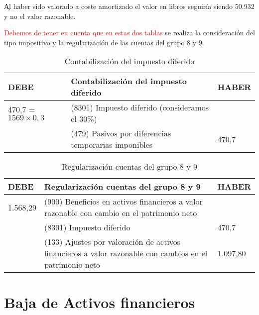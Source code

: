 \c{Al haber sido valorado a coste amortizado el valor en libros seguiría siendo 50.932 y no el valor razonable.}

\textcolor{red}{Debemos de tener en cuenta que en estas dos tablas} se realiza la consideración del tipo impositivo y la regularización de las cuentas del grupo 8 y 9.

\begin{table}[H]
    \centering
    \begin{tabular}{|p{3cm}|p{6cm}|p{3cm}|}
    \hline
    \rowcolor{blue!30}
    \textbf{DEBE} & \textbf{Contabilización del impuesto diferido} & \textbf{HABER} \\
    \hline
    470,7 = \(1569 \times 0,3\) & (8301) Impuesto diferido (consideramos el 30\%) & \\
    \hline
    & (479) Pasivos por diferencias temporarias imponibles & 470,7 \\
    \hline
    \end{tabular}
    \caption{Contabilización del impuesto diferido}
    \label{tabla:impuesto_diferido}
\end{table}

\begin{table}[H]
    \centering
    \begin{tabular}{|p{3cm}|p{6cm}|p{3cm}|}
    \hline
    \rowcolor{blue!30}
    \textbf{DEBE} & \textbf{Regularización cuentas del grupo 8 y 9} & \textbf{HABER} \\
    \hline
    1.568,29 & (900) Beneficios en activos financieros a valor razonable con cambio en el patrimonio neto & \\
    \hline
    & (8301) Impuesto diferido &470,7  \\
    \hline
    & (133) Ajustes por valoración de activos financieros a valor razonable con cambios en el patrimonio neto & 1.097,80 \\
    \hline
    \end{tabular}
    \caption{Regularización cuentas del grupo 8 y 9}
    \label{tabla:regularizacion_grupo_8_9}
\end{table}














\newpage
\section{Baja de Activos financieros}

